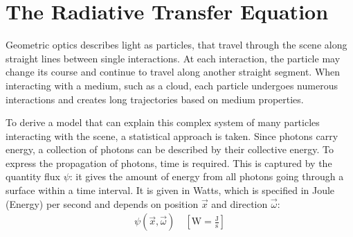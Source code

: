 \section{The Radiative Transfer Equation}

Geometric optics describes light as particles, that travel through the scene along straight lines between single interactions. At each interaction, the particle may change its course and continue to travel along another straight segment. When interacting with a medium, such as a cloud, each particle undergoes numerous interactions and creates long trajectories based on medium properties.

To derive a model that can explain this complex system of many particles interacting with the scene, a statistical approach is taken. Since photons carry energy, a collection of photons can be described by their collective energy. To express the propagation of photons, time is required. This is captured by the quantity flux $\psi$: it gives the amount of energy from all photons going through a surface within a time interval. It is given in Watts, which is specified in Joule (Energy) per second and depends on position $\vec{x}$ and direction $\vec{\omega}$:
\begin{align*}
\psi\left(\vec{x}, \vec{\omega}\right)
\quad
\left[\si{\watt} = \frac{\si{\joule}}{\si{\second}}\right]
\end{align*}

